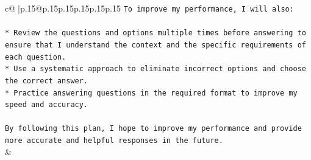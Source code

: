 \documentclass{article}
\begin{document}
{\begin{supertabular}{c@{$\;$}|p{.15\linewidth}@{}p{.15\linewidth}p{.15\linewidth}p{.15\linewidth}p{.15\linewidth}p{.15\linewidth}}
{{{\texttt{To improve my performance, I will also:} \\
\\ 
\texttt{* Review the questions and options multiple times before answering to ensure that I understand the context and the specific requirements of each question.} \\
\texttt{* Use a systematic approach to eliminate incorrect options and choose the correct answer.} \\
\texttt{* Practice answering questions in the required format to improve my speed and accuracy.} \\
\\ 
\texttt{By following this plan, I hope to improve my performance and provide more accurate and helpful responses in the future.} \\
            }
        }
    }
    & \\ \\

\end{supertabular}
}
\end{document}
